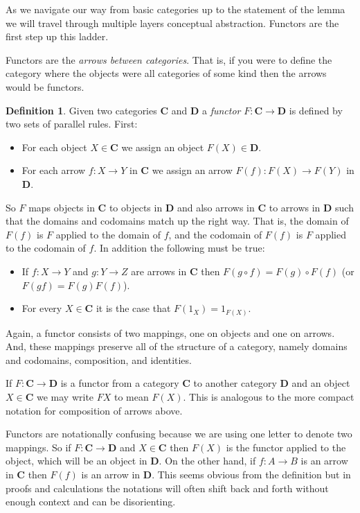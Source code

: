 \documentclass[12pt]{article}
\theoremstyle{definition}
\theoremstyle{definition}
\newtheorem{defn}{Definition}[]
\theoremstyle{definition}
\numberwithin{equation}{section}
\newcommand{\cat}[1]{\mathbf{#1}}      %
\newcommand{\CC}{\cat{C}}
\newcommand{\DD}{\cat{D}}
\def\ni{\goodbreak\noindent}
\begin{document}
As we navigate our way from basic categories up to the statement of the lemma we will
travel through multiple layers conceptual abstraction. Functors are the first step up this
ladder.

Functors are the {\it arrows between categories}. That is, if you were to define the
category where the objects were all categories of some kind then the arrows would be
functors.

\goodbreak
\begin{defn}
Given two categories $\CC$ and $\DD$ a {\it functor} $F : \CC \to \DD$ is defined by two
sets of parallel rules. First:
\begin{itemize}
\item For each object $X \in \CC$ we assign an object $F(X) \in \DD$.
\item For each arrow $f: X \to Y$ in $\CC$ we assign an arrow $F(f): F(X) \to F(Y)$ in
$\DD$.
\end{itemize}
\ni
So $F$ maps objects in $\CC$ to objects in $\DD$ and also arrows in $\CC$ to arrows in
$\DD$ such that the domains and codomains match up the right way. That is, the domain of
$F(f)$ is $F$ applied to the domain of $f$, and the codomain of $F(f)$ is $F$ applied to
the codomain of $f$. In addition the following must be true:
\begin{itemize}
\item If $f:X \to Y$ and $g: Y \to Z$ are arrows in $\CC$ then $F(g \circ f) = F(g) \circ
F(f)$ (or $F(gf) = F(g)F(f)$).
\item For every $X \in \CC$ it is the case that $F(1_X) = 1_{F(X)}$.
\end{itemize}

\end{defn}
\ni
Again, a functor consists of two mappings, one on objects and one on arrows. And, these
mappings preserve all of the structure of a category, namely domains and codomains,
composition, and identities.

If $F: \CC \to \DD$ is a functor from a category $\CC$ to another category $\DD$ and an
object $X \in \CC$ we may write $F X$ to mean $F(X)$. This is analogous to the more
compact notation for composition of arrows above.

Functors are notationally confusing because we are using one letter to denote two
mappings. So if $F: \CC \to \DD$ and $X \in \CC$ then $F(X)$ is the functor applied to the
object, which will be an object in $\DD$. On the other hand, if $f : A \to B$ is an arrow
in $\CC$ then $F(f)$ is an arrow in $\DD$. This seems obvious from the definition but in
proofs and calculations the notations will often shift back and forth without enough
context and can be disorienting.
\end{document}

